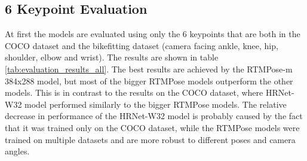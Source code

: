 \subsection{6 Keypoint Evaluation}

At first the models are evaluated using only the 6 keypoints that are both in the COCO dataset and the bikefitting dataset (camera facing ankle, knee, hip, shoulder, elbow and wrist). The results are shown in table \ref{tab:evaluation_results_all}. The best results are achieved by the RTMPose-m 384x288 model, but most of the bigger RTMPose models outperform the other models. This is in contrast to the results on the COCO dataset, where HRNet-W32 model performed similarly to the bigger RTMPose models. The relative decrease in performance of the HRNet-W32 model is probably caused by the fact that it was trained only on the COCO dataset, while the RTMPose models were trained on multiple datasets and are more robust to different poses and camera angles.





